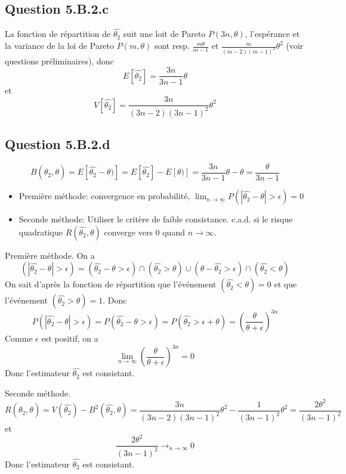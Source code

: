 \documentclass[]{book}
\theoremstyle{definition}
\begin{document}
\subsection*{Question 5.B.2.c}
La fonction de r\'epartition de $\hat{\theta_2}$ suit une loit de Pareto $P(3n, \theta)$, l'esp\'erance et la variance de la loi de Pareto $P(m, \theta)$ sont resp. $\frac{m\theta}{m-1}$ et $\frac{m}{(m-2)(m-1)^2}\theta^2$ (voir questions pr\'eliminaires), donc
$$
E[\hat{\theta_2}] = \frac{3n}{3n-1}\theta
$$ 
et 
$$
V[\hat{\theta_2}] = \frac{3n}{(3n-2)(3n-1)^2}\theta^2
$$


\subsection*{Question 5.B.2.d}
$$
B(\hat{\theta_2},\theta) = E[\hat{\theta_2} - \theta)] = E[\hat{\theta_2}] - E[\theta)] = \frac{3n}{3n-1}\theta - \theta = \frac{\theta}{3n-1} 
$$

\begin{itemize}
    \item Premi\`ere m\'ethode: convergence en probabilit\'e, $\lim_{n \to \infty}P(|\hat{\theta_2}-\theta| > \epsilon) = 0$
    \item Seconde m\'ethode: Utiliser le crit\`ere de faible consistance. c.a.d. si le risque quadratique $R(\hat{\theta_2},\theta)$ converge vers 0 quand $n \to \infty$. 
\end{itemize}

Premi\`ere m\'ethode.
On a 
$$
(|\hat{\theta_2}-\theta|>\epsilon) = (\hat{\theta_2}-\theta > \epsilon ) \cap (\hat{\theta_2}>\theta) \cup (\theta - \hat{\theta_2} > \epsilon ) \cap (\hat{\theta_2} <\theta)
$$
On sait d'apr\`es la fonction de r\'epartition que l'\'ev\'enement $(\hat{\theta_2} <\theta) = 0$ et que l'\'ev\'enement $(\hat{\theta_2} > \theta) = 1$. Donc
$$
P(|\hat{\theta_2}-\theta| > \epsilon) = P(\hat{\theta_2}-\theta > \epsilon ) = P(\hat{\theta_2} > \epsilon +\theta) = \left(\frac{\theta}{\theta+\epsilon}\right)^{3n}
$$
Comme $\epsilon$ est positif, on a 
$$
\lim_{n \to \infty} \left(\frac{\theta}{\theta+\epsilon}\right)^{3n} = 0
$$
Donc l'estimateur $\hat{\theta_2}$ est consistant.



Seconde m\'ethode.
$$
R(\hat{\theta_2},\theta) = V(\hat{\theta_2}) - B^2(\hat{\theta_2},\theta) = \frac{3n}{(3n-2)(3n-1)^2}\theta^2 - \frac{1}{(3n-1)^2}\theta^2 = \frac{2\theta^2}{(3n-1)^2}
$$
et
$$
\frac{2\theta^2}{(3n-1)^2} \to_{n \to \infty} 0
$$
Donc l'estimateur $\hat{\theta_2}$ est consistant.
\end{document}
